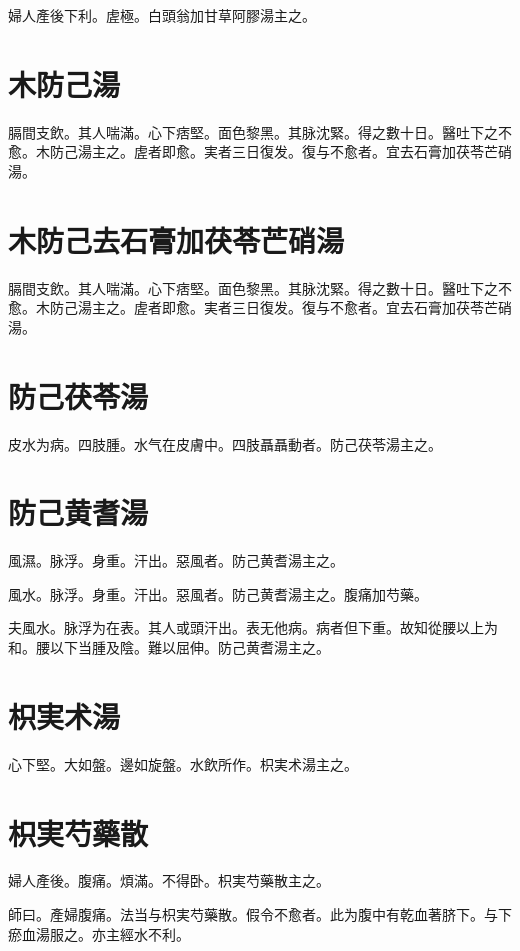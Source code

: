 {\khaaitp 婦人}產後下利。虗極。白頭翁加甘草阿膠湯主之。

\section{木防己湯}

膈間支飲。其人喘滿。心下痞堅。面色黎黑。其脉沈緊。得之數十日。醫吐下之不愈。木防己湯主之。虗者即愈。実者三日復发。復与不愈者。宜去石膏加茯苓芒硝湯。

\section{木防己去石膏加茯苓芒硝湯}

膈間支飲。其人喘滿。心下痞堅。面色黎黑。其脉沈緊。得之數十日。醫吐下之不愈。木防己湯主之。虗者即愈。実者三日復发。復与不愈者。宜去石膏加茯苓芒硝湯。

\section{防己茯苓湯}

皮水为病。四肢腫。水气在皮膚中。四肢聶聶動者。防己茯苓湯主之。

\section{防己黄耆湯}

風濕。脉浮。身重。汗出。惡風者。防己黄耆湯主之。

風水。脉浮。身重。汗出。惡風者。防己黄耆湯主之。腹痛加芍藥。

夫風水。脉浮为在表。其人或頭汗出。表无他病。病者但下重。故知從腰以上为和。腰以下当腫及陰。難以屈伸。防己黄耆湯主之。

\section{枳実术湯}

心下堅。大如盤。邊如旋盤。水飲所作。枳{\khaaitp 実}术湯主之。

\section{枳実芍藥散}

{\khaaitp 婦人}產後。腹痛。煩滿。不得卧。枳実芍藥散主之。

師曰。產婦腹痛。法当与枳実芍藥散。假令不愈者。此为腹中有乾血著脐下。与下瘀血湯服之。{\khaaitp 亦}主經水不利。

